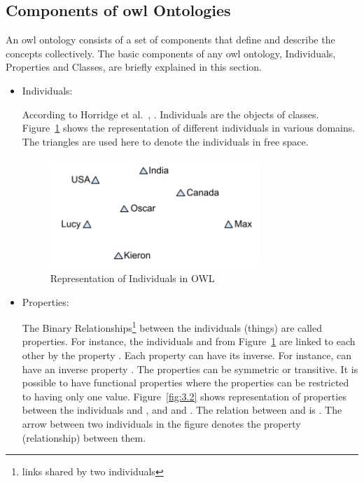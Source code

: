 \begin{doublespace}
\subsection{Components of \ac{owl} Ontologies}
\par An \ac{owl} ontology consists of a set of components that define and describe the concepts collectively. The basic components of any \ac{owl} ontology, Individuals, Properties and Classes, are briefly explained in this section.
\begin{itemize}
    \item Individuals:
    \par According to Horridge et al.~\cite{horridge2009practical}, . Individuals are the objects of classes. Figure~\ref{fig:3.1} shows the representation of different individuals in various domains. The triangles are used here to denote the individuals in free space.
    \begin{figure}[htp]
    \centering
    \includegraphics[width=8cm]{images/ch3/Figure1.png}
    \caption{Representation of Individuals in OWL}
    \label{fig:3.1}
\end{figure}
    \item Properties:
    \par The Binary Relationships\footnote{links shared by two individuals} between the individuals (things) are called properties. For instance, the individuals  and  from Figure~\ref{fig:3.1} are linked to each other by the property . Each property can have its inverse. For instance,  can have an inverse property . The properties can be symmetric or transitive. It is possible to have functional properties where the properties can be restricted to having only one value. Figure~\ref{fig:3.2} shows representation of properties between the individuals  and , and  and . The relation between  and  is . The arrow between two individuals in the figure denotes the property (relationship) between them.

\end{itemize}
\end{doublespace}
